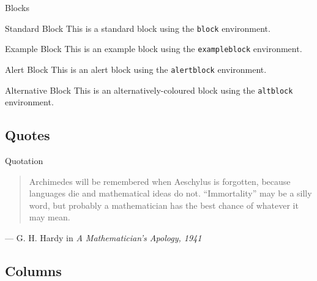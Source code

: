 \documentclass[,aspectratio=43]{beamer}
\begin{document}
\begin{frame}[fragile]{Blocks}
\begin{block}{Standard Block}
\label{standard-block}
This is a standard block using the \texttt{block} environment.
\end{block}

\begin{exampleblock}{Example Block}
This is an example block using the \texttt{exampleblock} environment.

\end{exampleblock}

\begin{alertblock}{Alert Block}
This is an alert block using the \texttt{alertblock} environment.

\end{alertblock}

\begin{altblock}{Alternative Block}
This is an alternatively-coloured block using the \texttt{altblock}
environment.

\end{altblock}
\end{frame}

\subsection{Quotes}\label{quotes}

\begin{frame}{Quotation}
\label{quotation}
\begin{quote}
Archimedes will be remembered when Aeschylus is forgotten, because
languages die and mathematical ideas do not. ``Immortality'' may be a
silly word, but probably a mathematician has the best chance of whatever
it may mean.
\end{quote}

\hfill --- G. H. Hardy in \emph{A Mathematician's Apology, 1941}
\end{frame}

\subsection{Columns}\label{columns}
\end{document}
